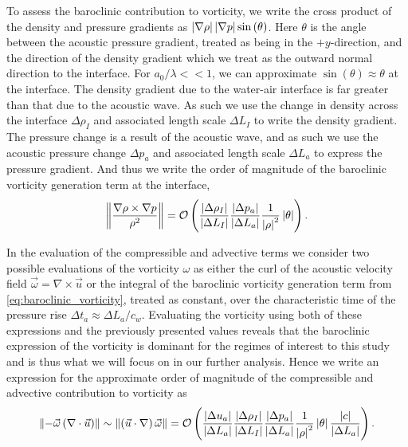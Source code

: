 To assess the baroclinic contribution to vorticity, we write the cross
product of the density and pressure gradients as
$\left|\nabla \rho\right| \left|\nabla p\right| \sin{\left(\theta\right)}$. Here
$\theta$ is the angle between the acoustic pressure gradient, treated
as being in the $\plus y$-direction, and the direction of the density
gradient which we treat as the outward normal direction to the
interface. For $a_0/\lambda<<1$, we can approximate
$\sin{\left(\theta\right)}\approx\theta$ at the interface. The density
gradient due to the water-air interface is far greater than that due
to the acoustic wave. As such we use the change in density across the
interface $\Delta \rho_I$ and associated length scale $\Delta L_I$ to
write the density gradient. The pressure change is a result of the
acoustic wave, and as such we use the acoustic pressure change
$\Delta p_a$ and associated length scale $\Delta L_a$ to express the
pressure gradient. And thus we write the order of magnitude of the
baroclinic vorticity generation term at the interface,
\begin{align}
  \label{eq:baroclinic_vorticity}%
  \norm{\frac{\nabla\rho\times\nabla p}{\rho^2}} = \orderof{\frac{\abs{\Delta \rho_I}}{\abs{\Delta L_I}}\frac{\abs{\Delta p_a}}{\abs{\Delta L_a}}\frac{1}{\abs{\rho}^2}\abs{\theta}}.%
\end{align}

In the evaluation of the compressible and advective terms we consider
two possible evaluations of the vorticity $\omega$ as either the curl
of the acoustic velocity field $\vec{\omega}=\nabla\times\vec{u}$ or
the integral of the baroclinic vorticity generation term from
\eqref{eq:baroclinic_vorticity}, treated as constant, over the
characteristic time of the pressure rise
$\Delta t_a\approx\Delta L_a/c_w$. Evaluating the vorticity using both
of these expressions and the previously presented values reveals that
the baroclinic expression of the vorticity is dominant for
the regimes of interest to this study and is thus what we will focus
on in our further analysis. Hence we write an expression for the
approximate order of magnitude of the compressible and advective
contribution to vorticity as
\begin{align}
  \label{eq:compressible_advective_vorticity}%
\norm{-\vec{\omega}\left(\nabla\cdot\vec{u}\right)}\sim \norm{\left(\vec{u}\cdot\nabla\right)\vec{\omega}} = %
\orderof{\frac{\abs{\Delta u_a}}{\abs{\Delta L_a}} \frac{\abs{\Delta \rho_I}}{\abs{\Delta L_I}}\frac{\abs{\Delta p_a}}{\abs{\Delta L_a}}\frac{1}{\abs{\rho}^2}\abs{\theta}\frac{\abs{c}}{\abs{\Delta L_a}}}.%
\end{align}

